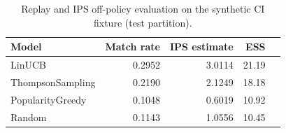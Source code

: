 \begin{table}[h]
\centering
\caption{Replay and IPS off-policy evaluation on the synthetic CI fixture (test partition).}
\label{tab:results}
\begin{tabular}{lrrrr}
\toprule
Model & Match rate & IPS estimate & ESS \\
\midrule
LinUCB            & 0.2952 & 3.0114 & 21.19 \\
ThompsonSampling  & 0.2190 & 2.1249 & 18.18 \\
PopularityGreedy  & 0.1048 & 0.6019 & 10.92 \\
Random            & 0.1143 & 1.0556 & 10.45 \\
\bottomrule
\end{tabular}
\end{table}
